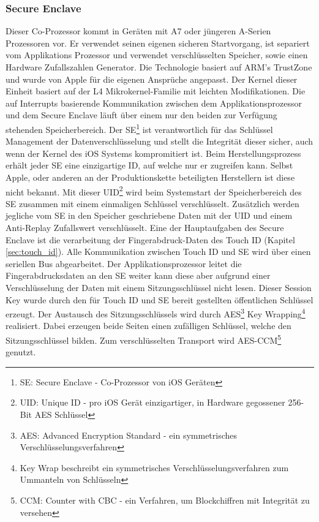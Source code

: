	\subsubsection{Secure Enclave}\label{sec:secure_enclave}
		Dieser Co-Prozessor kommt in Geräten mit A7 oder jüngeren A-Serien Prozessoren
		vor. Er verwendet seinen eigenen sicheren Startvorgang, ist separiert vom
		Applikations Prozessor und verwendet verschlüsselten Speicher, sowie einen
		Hardware Zufallszahlen Generator. Die Technologie basiert auf ARM's
		TrustZone\cite{TrustZone2015} und wurde von Apple für die eigenen Ansprüche
		angepasst. Der Kernel dieser Einheit basiert auf der L4
		Mikrokernel-Familie\cite{L4MicroKernel2015} mit leichten Modifikationen. Die
		auf Interrupts basierende Kommunikation zwischen dem Applikationsprozessor
		und dem Secure Enclave läuft über einem nur den beiden zur Verfügung
		stehenden Speicherbereich.
		Der SE\footnote{SE: Secure Enclave - Co-Prozessor von iOS Geräten} ist
		verantwortlich für das Schlüssel Management der Datenverschlüsselung und
		stellt die Integrität dieser sicher, auch wenn der Kernel des iOS Systems
		kompromitiert ist. Beim Herstellungsprozess erhält jeder SE eine einzigartige
		ID, auf welche nur er zugreifen kann. Selbst Apple, oder anderen an der
		Produktionskette beteiligten Herstellern ist diese nicht bekannt.
		Mit dieser UID\footnote{UID: Unique ID - pro iOS Gerät einzigartiger,
		in Hardware gegossener 256-Bit AES Schlüssel} wird beim Systemstart der
		Speicherbereich des SE zusammen mit einem einmaligen Schlüssel verschlüsselt.
		Zusätzlich werden jegliche vom SE in den Speicher geschriebene Daten mit der
		UID und einem Anti-Replay Zufallswert verschlüsselt. Eine der Hauptaufgaben
		des Secure Enclave ist die verarbeitung der Fingerabdruck-Daten des Touch ID
		(Kapitel \ref{sec:touch_id}).
		Alle Kommunikation zwischen Touch ID und SE wird über einen seriellen Bus
		abgearbeitet. Der Applikationsprozessor leitet die Fingerabdrucksdaten an den
		SE weiter kann diese aber aufgrund einer Verschlüsselung der Daten mit einem
		Sitzungsschlüssel nicht lesen. Dieser Session Key wurde durch den für Touch
		ID und SE bereit gestellten öffentlichen Schlüssel erzeugt. Der Austausch des
		Sitzungsschlüssels wird durch AES\footnote{AES: Advanced Encryption Standard
		- ein symmetrisches Verschlüsselungsverfahren} Key
		Wrapping\footnote{Key Wrap beschreibt ein symmetrisches
		Verschlüsselungsverfahren zum Ummanteln von Schlüsseln} realisiert.
		Dabei erzeugen beide Seiten einen zufälligen Schlüssel, welche den Sitzungsschlüssel bilden.
		Zum verschlüsselten Transport wird AES-CCM\footnote{CCM: Counter with CBC -
		ein Verfahren, um Blockchiffren mit Integrität zu versehen} genutzt.
